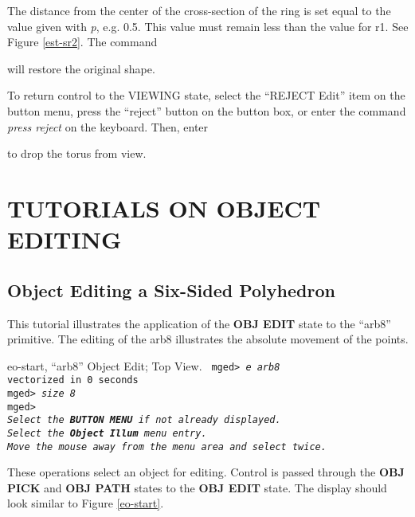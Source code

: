 
The distance from the center of the cross-section of the ring is set equal
to the value given with {\em p}, e.g. 0.5.
This value must remain less than the value for r1.
See Figure \ref{est-sr2}.
The command


will restore the original shape.

To return control to the VIEWING state, select the ``REJECT Edit''
item on the button menu, press the ``reject'' button on the button box,
or enter the command {\em press reject} on the keyboard.
Then, enter


to drop the torus from view.
\chapter{TUTORIALS ON OBJECT EDITING}

\section{Object Editing a Six-Sided Polyhedron}

This tutorial illustrates the application of the {\bf OBJ EDIT} state to
the ``arb8'' primitive.  The editing of the arb8 illustrates the
absolute movement of the points.

\mfig eo-start, ``arb8'' Object Edit; Top View.
\noindent
{\tt
mged> {\em e arb8}\\
vectorized in 0 seconds\\
mged> {\em size 8}\\
mged>\\
{\em Select the {\bf BUTTON MENU} if not already displayed.} \\
{\em Select the {\bf Object Illum} menu entry.} \\
{\em Move the mouse away from the menu area and select twice.} \\
}

These operations select an object for editing.
Control is passed through the {\bf OBJ PICK} and {\bf OBJ PATH} states
to the {\bf OBJ EDIT} state.  The display should look similar to
Figure \ref{eo-start}.

